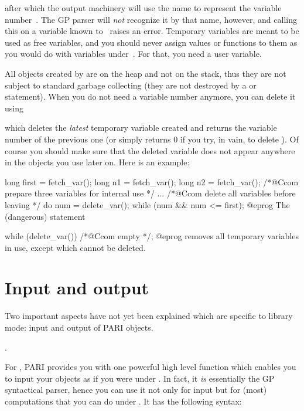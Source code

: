 
\noindent after which the output machinery will use the name  to
represent the variable number~. The GP parser will \emph{not}
recognize it by that name, however, and calling this on a variable known
to~ raises an error. Temporary variables are meant to be used as free
variables, and you should never assign values or functions to them as you
would do with variables under~. For that, you need a user variable.

All objects created by  are on the heap and not on the stack,
thus they are not subject to standard garbage collecting (they are not
destroyed by a  or  statement). When you do
not need a variable number anymore, you can delete it using


\noindent which deletes the \emph{latest} temporary variable created and
returns the variable number of the previous one (or simply returns 0 if you
try, in vain, to delete ). Of course you should make sure that
the deleted variable does not appear anywhere in the objects you use later
on. Here is an example:

\bprog
  long first = fetch_var();
  long n1 = fetch_var();
  long n2 = fetch_var(); /*@Ccom prepare three variables for internal use */
  ...
  /*@Ccom delete all variables before leaving */
  do { num = delete_var(); } while (num && num <= first);
@eprog\noindent
The (dangerous) statement

\bprog
  while (delete_var()) /*@Ccom empty */;
@eprog\noindent
removes all temporary variables in use, except  which cannot be
deleted.

\section{Input and output}

\noindent
Two important aspects have not yet been explained which are specific to
library mode: input and output of PARI objects.

.

\noindent
For , PARI provides you with one powerful high level function
which enables you to input your objects as if you were under . In fact,
it \emph{is} essentially the GP syntactical parser, hence you can use it not
only for input but for (most) computations that you can do under .
It has the following syntax:\label{se:gp_read_str}

